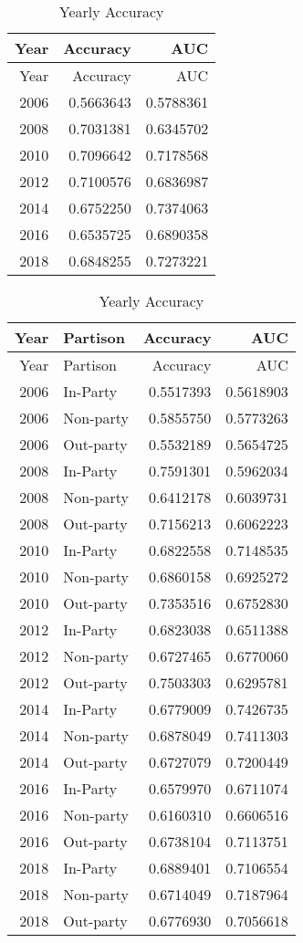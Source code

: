 \documentclass[
  english,
  man]{article}
\begin{document}
\begin{longtable}[]{@{}rrr@{}}
\caption{\label{tab:unnamed-chunk-12}Yearly Accuracy}\tabularnewline
\toprule
Year & Accuracy & AUC \\
\midrule
\endfirsthead
\toprule
Year & Accuracy & AUC \\
\midrule
\endhead
2006 & 0.5663643 & 0.5788361 \\
2008 & 0.7031381 & 0.6345702 \\
2010 & 0.7096642 & 0.7178568 \\
2012 & 0.7100576 & 0.6836987 \\
2014 & 0.6752250 & 0.7374063 \\
2016 & 0.6535725 & 0.6890358 \\
2018 & 0.6848255 & 0.7273221 \\
\bottomrule
\end{longtable}

\begin{longtable}[]{@{}rlrr@{}}
\caption{\label{tab:unnamed-chunk-12}Yearly Accuracy}\tabularnewline
\toprule
Year & Partison & Accuracy & AUC \\
\midrule
\endfirsthead
\toprule
Year & Partison & Accuracy & AUC \\
\midrule
\endhead
2006 & In-Party & 0.5517393 & 0.5618903 \\
2006 & Non-party & 0.5855750 & 0.5773263 \\
2006 & Out-party & 0.5532189 & 0.5654725 \\
2008 & In-Party & 0.7591301 & 0.5962034 \\
2008 & Non-party & 0.6412178 & 0.6039731 \\
2008 & Out-party & 0.7156213 & 0.6062223 \\
2010 & In-Party & 0.6822558 & 0.7148535 \\
2010 & Non-party & 0.6860158 & 0.6925272 \\
2010 & Out-party & 0.7353516 & 0.6752830 \\
2012 & In-Party & 0.6823038 & 0.6511388 \\
2012 & Non-party & 0.6727465 & 0.6770060 \\
2012 & Out-party & 0.7503303 & 0.6295781 \\
2014 & In-Party & 0.6779009 & 0.7426735 \\
2014 & Non-party & 0.6878049 & 0.7411303 \\
2014 & Out-party & 0.6727079 & 0.7200449 \\
2016 & In-Party & 0.6579970 & 0.6711074 \\
2016 & Non-party & 0.6160310 & 0.6606516 \\
2016 & Out-party & 0.6738104 & 0.7113751 \\
2018 & In-Party & 0.6889401 & 0.7106554 \\
2018 & Non-party & 0.6714049 & 0.7187964 \\
2018 & Out-party & 0.6776930 & 0.7056618 \\
\bottomrule
\end{longtable}
\end{document}
